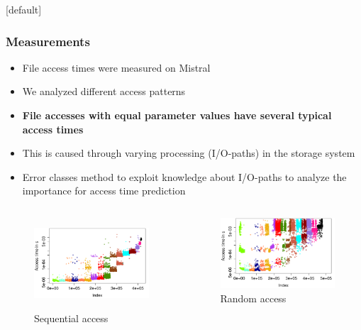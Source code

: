 \documentclass{beamer}
\makeatletter
\newenvironment{withoutheadline}{
	\setbeamertemplate{headline}[default]
	\def\beamer@entrycode{\vspace*{-\headheight}}
}{}
\makeatother
\begin{document}
\begin{withoutheadline}
	\begin{frame}
		\frametitle{Measurements}
		\begin{itemize}
			\item File access times were measured on Mistral
			\item We analyzed different access patterns
			\item \textbf{File accesses with equal parameter values have several typical access times}
			\item This is caused through varying processing (I/O-paths) in the storage system
			\item Error classes method to exploit knowledge about I/O-paths to analyze the importance for access time prediction
		\end{itemize}
		\begin{columns}
			\begin{figure}
				\includegraphics[width=1\linewidth]{Bilder/plot_SizeSorted_log_read_seq.png}\\
				\caption{Sequential access}
			\end{figure}
			\begin{figure}
				\includegraphics[width=1\linewidth]{Bilder/plot_SizeSorted_log_read_rnd.png}
				\caption{Random access}	
		\end{figure}
		\end{columns}
	\end{frame}
\end{withoutheadline}
\end{document}
